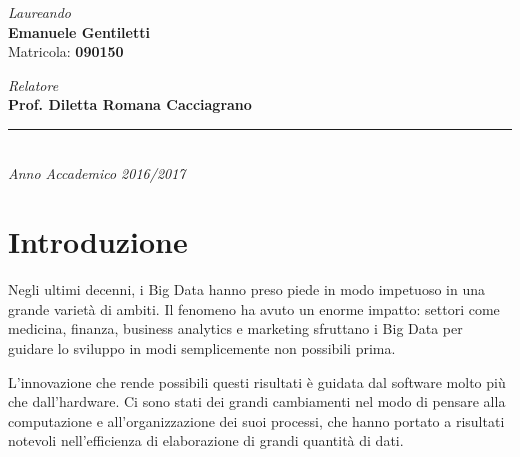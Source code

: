 \documentclass[italian,a4paper, twoside, 12pt]{report}
\begin{document}
\begin{titlepage}
\begin{minipage}[t]{0.47\textwidth}
    \begin{center}
    {\LARGE{\textsl{Laureando}
    \vspace{0.2cm}\\
    \textbf{Emanuele Gentiletti}\\
    \vspace{1.7cm}
    Matricola: \textbf{090150}
    }}

    \end{center}
\end{minipage}
\hfill
\begin{minipage}[t]{0.47\textwidth}
    \begin{center}
    {\LARGE{\textsl{Relatore}
    \vspace{0.2cm}\\
    \bf Prof. Diletta Romana Cacciagrano\\
    }}

    \end{center}
\end{minipage}
\vspace{35mm}
\begin{center}
\rule[0.1cm]{14cm}{0.1mm}\\
\vspace{2mm}
{\Large{\textsl{Anno Accademico 2016/2017}}}
\end{center}
\end{titlepage}
\restoregeometry
\clearpage
\cleardoublepage

{
\hypersetup{linkcolor=black}
\setcounter{tocdepth}{2}
\tableofcontents
}
\clearpage

\chapter*{Introduzione}\label{introduzione}

Negli ultimi decenni, i Big Data hanno preso piede in modo impetuoso in
una grande varietà di ambiti. Il fenomeno ha avuto un enorme impatto:
settori come medicina, finanza, business analytics e marketing sfruttano
i Big Data per guidare lo sviluppo in modi semplicemente non possibili
prima.

L'innovazione che rende possibili questi risultati è guidata dal
software molto più che dall'hardware. Ci sono stati dei grandi
cambiamenti nel modo di pensare alla computazione e all'organizzazione
dei suoi processi, che hanno portato a risultati notevoli
nell'efficienza di elaborazione di grandi quantità di dati.
\end{document}
